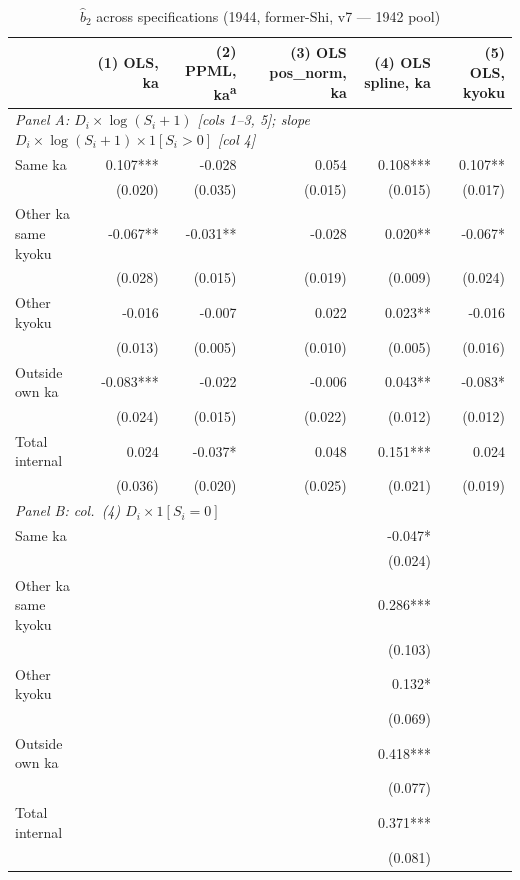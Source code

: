 \begin{table}[!htbp]
  \centering
  \caption{$\hat{b}_2$ across specifications (1944, former-Shi, v7 --- 1942 pool)}
  \label{tab:v7_main}
  \begin{tabular}{lrrrrr}
    \hline\hline
     & (1) OLS, ka & (2) PPML, ka\textsuperscript{a} & (3) OLS pos\_norm, ka & (4) OLS spline, ka & (5) OLS, kyoku \\
    \midrule
    \multicolumn{6}{l}{\textit{Panel A: $D_i \times \log(S_i{+}1)$ [cols 1--3, 5]; slope $D_i \times \log(S_i{+}1) \times 1[S_i{>}0]$ [col 4]}} \\
    \addlinespace
    Same ka & 0.107*** & -0.028 & 0.054 & 0.108*** & 0.107** \\
     & (0.020) & (0.035) & (0.015) & (0.015) & (0.017) \\
    Other ka same kyoku & -0.067** & -0.031** & -0.028 & 0.020** & -0.067* \\
     & (0.028) & (0.015) & (0.019) & (0.009) & (0.024) \\
    Other kyoku & -0.016 & -0.007 & 0.022 & 0.023** & -0.016 \\
     & (0.013) & (0.005) & (0.010) & (0.005) & (0.016) \\
    Outside own ka & -0.083*** & -0.022 & -0.006 & 0.043** & -0.083* \\
     & (0.024) & (0.015) & (0.022) & (0.012) & (0.012) \\
    Total internal & 0.024 & -0.037* & 0.048 & 0.151*** & 0.024 \\
     & (0.036) & (0.020) & (0.025) & (0.021) & (0.019) \\
    \midrule
    \multicolumn{6}{l}{\textit{Panel B: col.\ (4) $D_i \times 1[S_i{=}0]$}} \\
    \addlinespace
    Same ka &  &  &  & -0.047* &  \\
     &  &  &  & (0.024) &  \\
    Other ka same kyoku &  &  &  & 0.286*** &  \\
     &  &  &  & (0.103) &  \\
    Other kyoku &  &  &  & 0.132* &  \\
     &  &  &  & (0.069) &  \\
    Outside own ka &  &  &  & 0.418*** &  \\
     &  &  &  & (0.077) &  \\
    Total internal &  &  &  & 0.371*** &  \\
     &  &  &  & (0.081) &  \\
    \midrule

\end{tabular}
\end{table}
